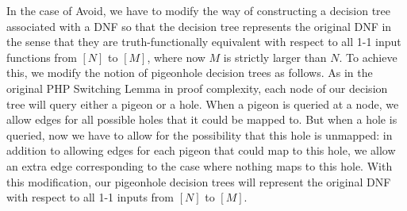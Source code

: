 In the case of Avoid, we have to modify the way of constructing a decision tree associated with a DNF so that the decision tree represents the original DNF in the sense that they are truth-functionally equivalent with respect to all 1-1 input functions from $[N]$ to $[M]$, where now $M$ is strictly larger than $N$. 
To achieve this, we modify the notion of pigeonhole decision trees as follows. As in the original PHP Switching Lemma in proof complexity, each node of our decision tree will query either a pigeon or a hole. When a pigeon is queried at a node, we allow edges for all possible holes that it could be mapped to. But when a hole is queried, now we have to allow for the possibility that this hole is unmapped: in addition to allowing edges for each pigeon that could map to this hole, we allow an extra edge corresponding to the case where nothing maps to this hole. With this modification, our pigeonhole decision trees will represent the original DNF with respect to all 1-1 inputs from $[N]$ to $[M]$. 

